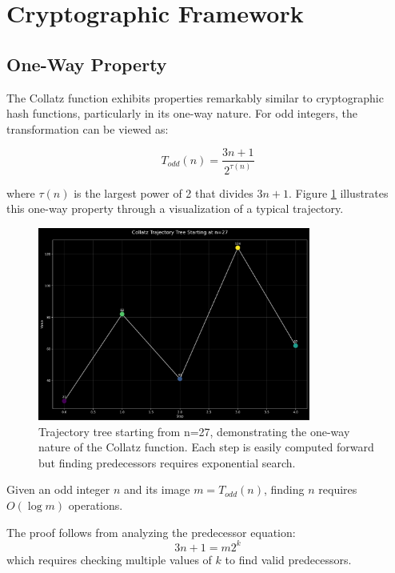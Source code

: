 \section{Cryptographic Framework}\label{sec:crypto_framework}

\subsection{One-Way Property}

The Collatz function exhibits properties remarkably similar to cryptographic hash functions, particularly in its one-way nature. For odd integers, the transformation can be viewed as:

\[
T_{odd}(n) = \frac{3n + 1}{2^{\tau(n)}}
\]

where $\tau(n)$ is the largest power of 2 that divides $3n + 1$. Figure \ref{fig:trajectory_tree} illustrates this one-way property through a visualization of a typical trajectory.

\begin{figure}[h]
\centering
\includegraphics[width=0.8\textwidth]{figures/trajectory_tree.svg}
\caption{Trajectory tree starting from n=27, demonstrating the one-way nature of the Collatz function. Each step is easily computed forward but finding predecessors requires exponential search.}
\label{fig:trajectory_tree}
\end{figure}

\begin{theorem}\label{thm:one_way}
Given an odd integer $n$ and its image $m = T_{odd}(n)$, finding $n$ requires $O(\log m)$ operations.
\end{theorem}

The proof follows from analyzing the predecessor equation:
\[
3n + 1 = m2^k
\]
which requires checking multiple values of $k$ to find valid predecessors.

